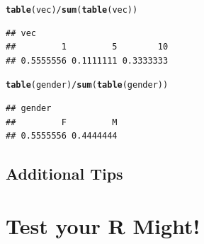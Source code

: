 \documentclass{tufte-book}\usepackage[]{graphicx}\usepackage[]{color}
\makeatletter
\newcommand{\hlopt}[1]{\textcolor[rgb]{0,0,0}{#1}}%
\newcommand{\hlstd}[1]{\textcolor[rgb]{0.345,0.345,0.345}{#1}}%
\newcommand{\hlkwd}[1]{\textcolor[rgb]{0.737,0.353,0.396}{\textbf{#1}}}%
\newenvironment{kframe}{%
 \def\at@end@of@kframe{}%
 \ifinner\ifhmode%
  \def\at@end@of@kframe{\end{minipage}}%
  \begin{minipage}{\columnwidth}%
 \fi\fi%
 \def\FrameCommand##1{\hskip\@totalleftmargin \hskip-\fboxsep
 \colorbox{shadecolor}{##1}\hskip-\fboxsep
     \hskip-\linewidth \hskip-\@totalleftmargin \hskip\columnwidth}%
 \MakeFramed {\advance\hsize-\width
   \@totalleftmargin\z@ \linewidth\hsize
   \@setminipage}}%
 {\par\unskip\endMakeFramed%
 \at@end@of@kframe}
\newenvironment{knitrout}{}{} %
\makeatother
\begin{document}
\begin{knitrout}
\color{fgcolor}\begin{kframe}
\begin{alltt}
\hlkwd{table}\hlstd{(vec)} \hlopt{/} \hlkwd{sum}\hlstd{(}\hlkwd{table}\hlstd{(vec))}
\end{alltt}
\begin{verbatim}
## vec
##         1         5        10 
## 0.5555556 0.1111111 0.3333333
\end{verbatim}
\begin{alltt}
\hlkwd{table}\hlstd{(gender)} \hlopt{/} \hlkwd{sum}\hlstd{(}\hlkwd{table}\hlstd{(gender))}
\end{alltt}
\begin{verbatim}
## gender
##         F         M 
## 0.5555556 0.4444444
\end{verbatim}
\end{kframe}
\end{knitrout}




\subsection{Additional Tips}

\section{Test your R Might!}
\end{document}
